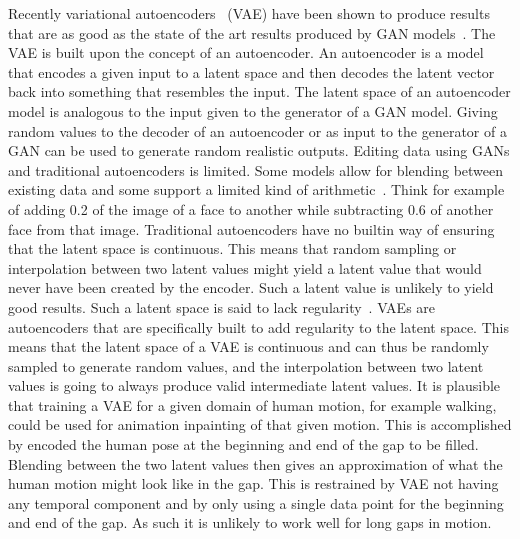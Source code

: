 Recently variational autoencoders~\cite{kingma2014autoencoding} (VAE) have been shown to produce results that are as good as the state of the art results produced by GAN models~\cite{razavi2019generating}. The VAE is built upon the concept of an autoencoder. An autoencoder is a model that encodes a given input to a latent space and then decodes the latent vector back into something that resembles the input. The latent space of an autoencoder model is analogous to the input given to the generator of a GAN model. Giving random values to the decoder of an autoencoder or as input to the generator of a GAN can be used to generate random realistic outputs. Editing data using GANs and traditional autoencoders is limited. Some models allow for blending between existing data and some support a limited kind of arithmetic~\cite{TODO}. Think for example of adding 0.2 of the image of a face to another while subtracting 0.6 of another face from that image. Traditional autoencoders have no builtin way of ensuring that the latent space is continuous. This means that random sampling or interpolation between two latent values might yield a latent value that would never have been created by the encoder. Such a latent value is unlikely to yield good results. Such a latent space is said to lack regularity~\cite{TODO}. VAEs are autoencoders that are specifically built to add regularity to the latent space. This means that the latent space of a VAE is continuous and can thus be randomly sampled to generate random values, and the interpolation between two latent values is going to always produce valid intermediate latent values. It is plausible that training a VAE for a given domain of human motion, for example walking, could be used for animation inpainting of that given motion. This is accomplished by encoded the human pose at the beginning and end of the gap to be filled. Blending between the two latent values then gives an approximation of what the human motion might look like in the gap. This is restrained by VAE not having any temporal component and by only using a single data point for the beginning and end of the gap. As such it is unlikely to work well for long gaps in motion.
